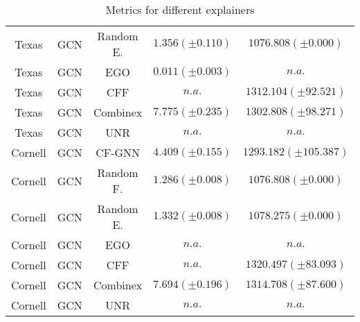 \begin{table*}
\begin{tabular}{ccccc}
  Texas & GCN & Random E. & $ 1.356 (\pm 0.110)$ & $ 1076.808 (\pm 0.000)$ \\
  Texas & GCN & EGO & $ 0.011 (\pm 0.003)$ & $n.a.$ \\
  Texas & GCN & CFF & $n.a.$ & $ 1312.104 (\pm 92.521)$ \\
  Texas & GCN & Combinex & $ 7.775 (\pm 0.235)$ & $ 1302.808 (\pm 98.271)$ \\
  Texas & GCN & UNR & $n.a.$ & $n.a.$ \\
  Cornell & GCN & CF-GNN & $ 4.409 (\pm 0.155)$ & $ 1293.182 (\pm 105.387)$ \\
  Cornell & GCN & Random F. & $ 1.286 (\pm 0.008)$ & $ 1076.808 (\pm 0.000)$ \\
  Cornell & GCN & Random E. & $ 1.332 (\pm 0.008)$ & $ 1078.275 (\pm 0.000)$ \\
  Cornell & GCN & EGO & $n.a.$ & $n.a.$ \\
  Cornell & GCN & CFF & $n.a.$ & $ 1320.497 (\pm 83.093)$ \\
  Cornell & GCN & Combinex & $ 7.694 (\pm 0.196)$ & $ 1314.708 (\pm 87.600)$ \\
  Cornell & GCN & UNR & $n.a.$ & $n.a.$ \\
\hline
\end{tabular}
\caption{Metrics for different explainers}
\end{table*}